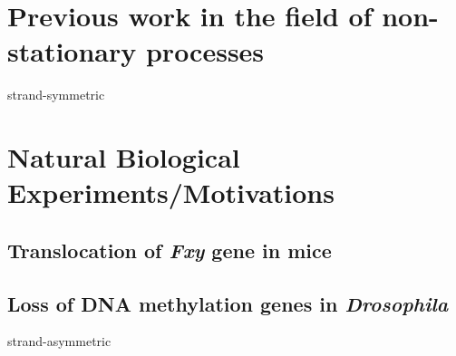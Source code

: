 \section{Previous work in the field of non-stationary processes}
\gls{strand-symmetric}
\section{Natural Biological Experiments/Motivations}

\subsection{Translocation of \textit{Fxy} gene in mice}

\subsection{Loss of DNA methylation genes in \textit{Drosophila}}

\gls{strand-asymmetric}